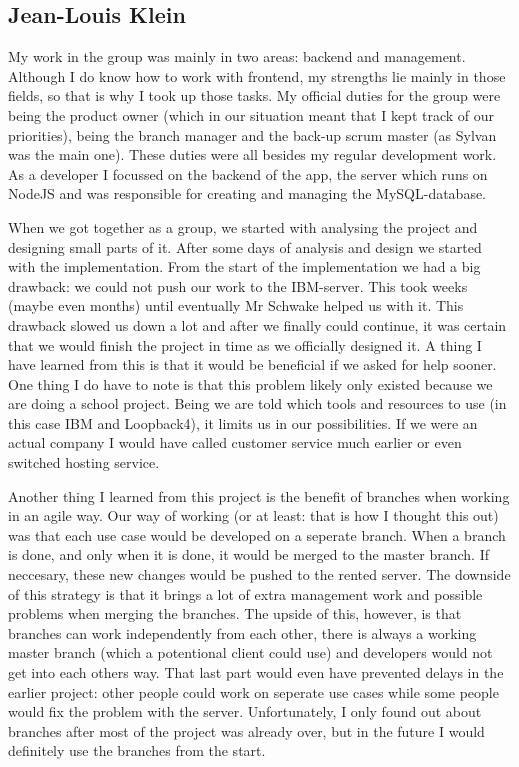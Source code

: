 \documentclass{article}
\begin{document}
\subsection*{Jean-Louis Klein}
My work in the group was mainly in two areas: backend and management. Although I do know how to work with frontend, my strengths lie mainly in those fields, so that is why I took up those tasks. My official duties for the group were being the product owner (which in our situation meant that I kept track of our priorities), being the branch manager and the back-up scrum master (as Sylvan was the main one). These duties were all besides my regular development work. As a developer I focussed on the backend of the app, the server which runs on NodeJS and was responsible for creating and managing the MySQL-database. 

When we got together as a group, we started with analysing the project and designing small parts of it. After some days of analysis and design we started with the implementation. From the start of the implementation we had a big drawback: we could not push our work to the IBM-server. This took weeks (maybe even months) until eventually Mr Schwake helped us with it. This drawback slowed us down a lot and after we finally could continue, it was certain that we would finish the project in time as we officially designed it. A thing I have learned from this is that it would be beneficial if we asked for help sooner. One thing I do have to note is that this problem likely only existed because we are doing a school project. Being we are told which tools and resources to use (in this case IBM and Loopback4), it limits us in our possibilities. If we were an actual company I would have called customer service much earlier or even switched hosting service. 

Another thing I learned from this project is the benefit of branches when working in an agile way. Our way of working (or at least: that is how I thought this out) was that each use case would be developed on a seperate branch. When a branch is done, and only when it is done, it would be merged to the master branch. If neccesary, these new changes would be pushed to the rented server. The downside of this strategy is that it brings a lot of extra management work and possible problems when merging the branches. The upside of this, however, is that branches can work independently from each other, there is always a working master branch (which a potentional client could use) and developers would not get into each others way. That last part would even have prevented delays in the earlier project: other people could work on seperate use cases while some people would fix the problem with the server. Unfortunately, I only found out about branches after most of the project was already over, but in the future I would definitely use the branches from the start.
\end{document}
